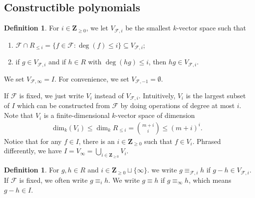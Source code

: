 \documentclass{amsart}
\theoremstyle{plain}
\theoremstyle{definition}
\newtheorem{definition}[theorem]{Definition}
\begin{document}
\subsection{Constructible polynomials}

\begin{definition}
For $i \in {\mathbf{Z}}_{\geq 0}$, we let $V_{\mathcal{F},i}$ be the smallest $k$-vector space such that
\begin{enumerate}
\item
$\mathcal{F} \cap R_{\leq i}=\{f \in \mathcal{F}: \deg(f) \leq i \} \subseteq V_{\mathcal{F},i}$;
\item
if $g \in V_{\mathcal{F},i}$ and if $h \in R$ with $\deg(hg) \leq i$, then $hg \in V_{\mathcal{F},i}$.
\end{enumerate}
We set $V_{\mathcal{F}, \infty}=I$. For convenience, we set $V_{\mathcal{F},-1}=\emptyset$. 
\end{definition}

If $\mathcal{F}$ is fixed, we just write $V_i$ instead of $V_{\mathcal{F},i}$.
Intuitively, $V_i$ is the largest subset of $I$ which can be constructed from $\mathcal{F}$ by doing operations of degree at most $i$.
Note that $V_i$ is a finite-dimensional $k$-vector space of dimension 
\begin{eqnarray*}
\mathrm{dim}_{k}(V_i) \leq \dim_k R_{\leq i}={{m+i}\choose{i}} \leq (m+i)^{i}.
\end{eqnarray*}
Notice that for any $f \in I$, there is an $i \in {\mathbf{Z}}_{\geq 0}$ such that $f \in V_i$. Phrased differently, we have $I=V_{\infty} = \bigcup_{i \in {\mathbf{Z}}_{\geq 0}} V_i$.

\begin{definition}
For $g,h \in R$ and $i \in {\mathbf{Z}}_{\geq 0} \sqcup \{\infty\}$. we write $g \equiv_{\mathcal{F},i} h$ if $g-h \in V_{\mathcal{F},i}$. If $\mathcal{F}$ is fixed, we often write $g \equiv_i h$. We write $g \equiv h$ if $g \equiv_{\infty}h$, which means $g-h \in I$.
\end{definition}
\end{document}
